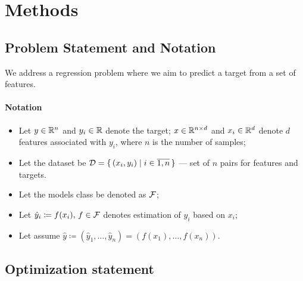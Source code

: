\section{Methods}
\label{sec:methods}


\subsection{Problem Statement and Notation}

We address a regression problem where we aim to predict a target from a set of features.

\paragraph{Notation}
\begin{itemize}
    \item Let \(y \in \mathbb{R}^n\) and \( y_i \in \mathbb{R} \) denote the target; \(x \in \mathbb{R}^{n \times d}\) and \( x_i \in \mathbb{R}^d \) denote \(d\) features associated with \( y_i \), where \(n\) is the number of samples;
    \item Let the dataset be \( \mathcal{D} = \set{(x_i, y_i) \mid i \in \overline{1, n}} \) --- set of \(n\) pairs for features and targets.
    \item Let the models class be denoted as \(\mathcal{F}\);
    \item Let \( \hat{y}_i \coloneqq f(x_i),\, f \in \mathcal{F}\) denotes estimation of \( y_i \) based on \( x_i \);
    \item Let assume \(\hat{y} \coloneqq \left( \hat{y}_1, \dots, \hat{y}_n \right) = \left( f(x_1), \dots, f(x_n) \right)\).
\end{itemize}

\subsection{Optimization statement}


